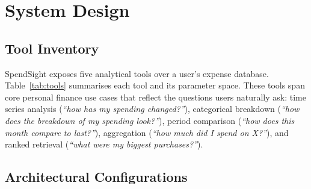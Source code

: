 \documentclass[11pt,twocolumn]{article}
\begin{document}
\section{System Design}

\subsection{Tool Inventory}

SpendSight exposes five analytical tools over a user's expense
database.
Table~\ref{tab:tools} summarises each tool and its parameter space.
These tools span core personal finance use cases that reflect the
questions users naturally ask: time series analysis (\emph{``how
has my spending changed?''}), categorical breakdown (\emph{``how 
does the breakdown of my spending look?''}), period comparison (\emph{``how
does this month compare to last?''}), aggregation (\emph{``how
much did I spend on X?''}), and ranked retrieval (\emph{``what
were my biggest purchases?''}).

\begin{table}[t]
\centering
\small
{}
\caption{Tool inventory. The five tools span visualisation (1--3),
aggregation (4), and retrieval (5).}
\label{tab:tools}
\end{table}

\subsection{Architectural Configurations}
\end{document}
